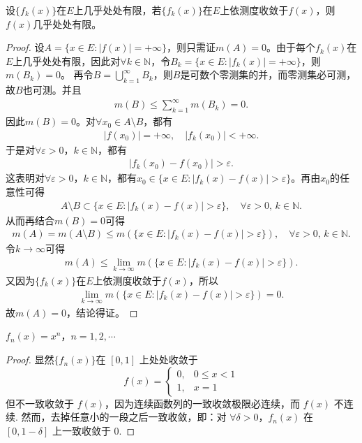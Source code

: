 \documentclass[../../main.tex]{subfiles}
\begin{document}
\begin{theorem}\label{theorem:依测度收敛的极限函数必几乎处处有限}
设\(\{f_k(x)\}\)在\(E\)上几乎处处有限，若\(\{f_k(x)\}\)在\(E\)上依测度收敛于\(f(x)\)，则\(f(x)\)几乎处处有限。
\end{theorem}
\begin{proof}
设\(A = \{x \in E : |f(x)| = +\infty\}\)，则只需证\(m(A) = 0\)。由于每个\(f_k(x)\)在\(E\)上几乎处处有限，因此对\(\forall k \in \mathbb{N}\)，令\(B_k = \{x \in E : |f_k(x)| = +\infty\}\)，则\(m(B_k) = 0\)。
再令\(B = \bigcup_{k=1}^{\infty} B_k\)，则\(B\)是可数个零测集的并，而零测集必可测，故\(B\)也可测。并且
\begin{align*}
m(B) \leqslant \sum_{k=1}^{\infty} m(B_k) = 0.
\end{align*}
因此\(m(B) = 0\)。对\(\forall x_0 \in A \setminus B\)，都有
\begin{align*}
|f(x_0)| = +\infty, \quad |f_k(x_0)| < +\infty.
\end{align*}
于是对\(\forall \varepsilon > 0\)，\(k \in \mathbb{N}\)，都有
\begin{align*}
|f_k(x_0) - f(x_0)| > \varepsilon.
\end{align*}
这表明对\(\forall \varepsilon > 0\)，\(k \in \mathbb{N}\)，都有\(x_0 \in \{x \in E : |f_k(x) - f(x)| > \varepsilon\}\)。再由\(x_0\)的任意性可得
\begin{align*}
A \setminus B \subset \{x \in E : |f_k(x) - f(x)| > \varepsilon\}, \quad \forall \varepsilon > 0, \, k \in \mathbb{N}.
\end{align*}
从而再结合\(m(B) = 0\)可得
\begin{align*}
m(A) = m(A \setminus B) \leqslant m(\{x \in E : |f_k(x) - f(x)| > \varepsilon\}), \quad \forall \varepsilon > 0, \, k \in \mathbb{N}.
\end{align*}
令\(k \to \infty\)可得
\begin{align*}
m(A) \leqslant \lim_{k \to \infty} m(\{x \in E : |f_k(x) - f(x)| > \varepsilon\}).
\end{align*}
又因为\(\{f_k(x)\}\)在\(E\)上依测度收敛于\(f(x)\)，所以
\begin{align*}
\lim_{k \to \infty} m(\{x \in E : |f_k(x) - f(x)| > \varepsilon\}) = 0.
\end{align*}
故\(m(A) = 0\)，结论得证。
\end{proof}

\begin{example}[收敛但不一致收敛的函数]

$f_n(x)=x^n$，$n = 1,2,\cdots$ 
\end{example}
\begin{proof}
显然$\{f_n(x)\}$在 $[0,1]$ 上处处收敛于
\[
f(x)=
\begin{cases}
0, & 0\leqslant x<1 \\
1, & x = 1
\end{cases}
\]
但不一致收敛于 $f(x)$，因为连续函数列的一致收敛极限必连续，而 $f(x)$ 不连续. 然而，去掉任意小的一段之后一致收敛，即：对 $\forall\delta>0$，$f_n(x)$ 在 $[0,1 - \delta]$ 上一致收敛于 $0$.
\end{proof}
\end{document}
